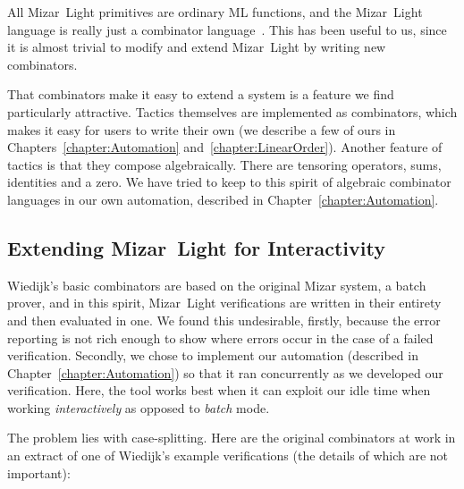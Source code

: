 All Mizar~Light primitives are ordinary ML functions, and the Mizar~Light language is really just a combinator language~\cite{CombinatorLanguages}. This has been useful to us, since it is almost trivial to modify and extend Mizar~Light by writing new combinators.

That combinators make it easy to extend a system is a feature we find particularly attractive. Tactics themselves are implemented as combinators, which makes it easy for users to write their own (we describe a few of ours in Chapters~\ref{chapter:Automation} and~\ref{chapter:LinearOrder}). Another feature of tactics is that they compose algebraically. There are tensoring operators, sums, identities and a zero. We have tried to keep to this spirit of algebraic combinator languages in our own automation, described in Chapter~\ref{chapter:Automation}.

\subsection{Extending Mizar~Light for Interactivity}\label{sec:MizarLightExtend}
Wiedijk's basic combinators are based on the original Mizar system, a batch prover, and in this spirit, Mizar~Light verifications are written in their entirety and then evaluated in one. We found this undesirable, firstly, because the error reporting is not rich enough to show where errors occur in the case of a failed verification. Secondly, we chose to implement our automation (described in Chapter~\ref{chapter:Automation}) so that it ran concurrently as we developed our verification. Here, the tool works best when it can exploit our idle time when working \emph{interactively} as opposed to \emph{batch} mode.

The problem lies with case-splitting. Here are the original combinators at work in an extract of one of Wiedijk's example verifications (the details of which are not important):

\vspace{0.5cm}
\begin{minipage}{\linewidth}
  \footnotesize



  \code{\enspace [fix ["p1:Point"; "p2:Point"];}


  \code{\quad\enspace[[suppose "p1 = p2";}

  \code{\qquad\enspace qed from [0] by [LEMMA1]];}

  \code{\qquad [suppose "$\neg$(p1 = p2)";}

  \code{\qquad\enspace qed from [1]]]];}

\end{minipage}
\vspace{0.5cm}


